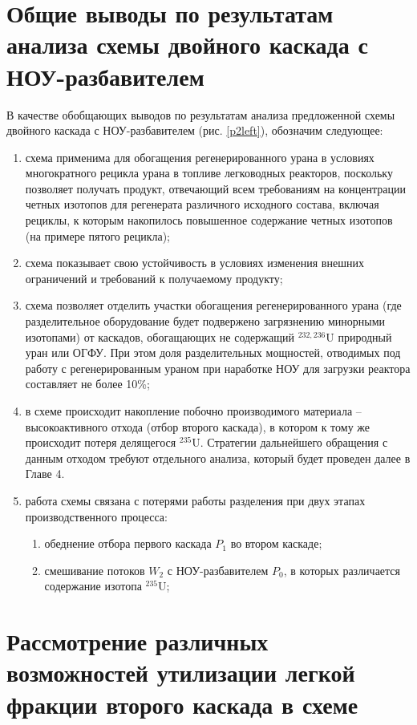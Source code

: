 \section{Общие выводы по результатам анализа схемы двойного каскада с НОУ-разбавителем}

В качестве обобщающих выводов по результатам анализа предложенной схемы двойного каскада с НОУ-разбавителем (рис. \ref{p2left}), обозначим следующее:
\begin{enumerate}
    \item схема применима для обогащения регенерированного урана в условиях многократного рецикла урана в топливе легководных реакторов, поскольку позволяет получать продукт, отвечающий всем требованиям на концентрации четных изотопов для регенерата различного исходного состава, включая рециклы, к которым накопилось повышенное содержание четных изотопов (на примере пятого рецикла);
    \item схема показывает свою устойчивость в условиях изменения внешних ограничений и требований к получаемому продукту;
    \item схема позволяет отделить участки обогащения регенерированного урана (где разделительное оборудование будет подвержено загрязнению минорными изотопами) от каскадов, обогащающих не содержащий $^{232,236}$U природный уран или ОГФУ. При этом доля разделительных мощностей, отводимых под работу с регенерированным ураном при наработке НОУ для загрузки реактора составляет не более 10\%;
     \item в схеме происходит накопление побочно производимого материала -- высокоактивного отхода (отбор второго каскада), в котором к тому же происходит потеря делящегося $^{235}$U. Стратегии дальнейшего обращения с данным отходом требуют отдельного анализа, который будет проведен далее в Главе 4.
    \item работа схемы связана с потерями работы разделения при двух этапах производственного процесса:
    \begin{enumerate}
        \item обеднение отбора первого каскада $P_1$ во втором каскаде;
        \item смешивание потоков $W_2$ с НОУ-разбавителем $P_0$, в которых различается содержание изотопа $^{235}$U;
    \end{enumerate}
\end{enumerate}






\section{Рассмотрение различных возможностей утилизации легкой фракции второго каскада в схеме}

